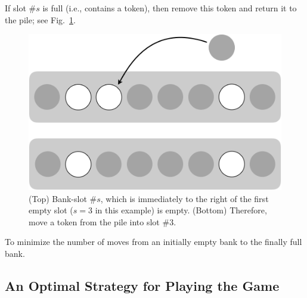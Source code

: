 \begin{enumerate}
If slot \#$s$ is full (i.e., contains a token), then remove this token and return it to the pile; see Fig.~\ref{fig:rule2}.
\begin{figure}[htb]
\begin{center}
        \includegraphics[scale=0.3]{FiguresMaths/GameTokenRule2.png}
\caption{(Top) Bank-slot \#$s$, which is immediately to the right of the first empty slot ($s=3$ in this example) is empty.  (Bottom) Therefore, move a token from the pile into slot \#$3$.}
        \label{fig:rule2}
\end{center}
\end{figure}
\end{enumerate}

\medskip

To minimize the number of moves from an initially empty bank to the finally full bank.

\subsection{An Optimal Strategy for Playing the Game}
\label{sec:Token-Game-Strategies}

